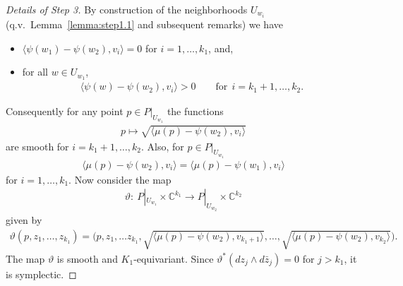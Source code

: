 \documentclass[10pt,a4paper]{amsart}
\numberwithin{equation}{section}
\begin{document}
\begin{proof}[Details of Step 3]
By construction of the neighborhoods $U_{w_i}$ (q.v.\
Lemma~\ref{lemma:step1.1} and subsequent remarks) we have
\begin{itemize}\itemsep=0pt
\item $\langle\psi(w_1)-\psi(w_2), v_i\rangle =0$ for $i=1,\ldots, k_1$, and,
\item for all $w\in U_{w_1}$,
\begin{gather*}
\langle \psi(w) - \psi(w_2), v_i\rangle>0 \qquad \textrm{for} \ \ i=k_1+1,\ldots, k_2.
\end{gather*}
\end{itemize}
Consequently  for any point $p\in P|_{U_{w_1}}$ the functions
\begin{gather*}
p\mapsto \sqrt{\langle \mu(p) - \psi(w_2),v_i \rangle}
\end{gather*}
are smooth for $i=k_1+1,\ldots, k_2$.  Also, for  $p\in P|_{U_{w_1}}$
\begin{gather*}
\langle \mu(p) - \psi(w_2),v_i \rangle = \langle \mu(p) - \psi(w_1),v_i \rangle
\end{gather*}
for $i=1,\ldots, k_1$.  Now consider the map
\begin{gather*}
\vartheta\colon \ P|_{U_{w_1}}\times {\mathbb C}^{k_1} \to P|_{U_{w_2}} \times {\mathbb C}^{k_2}
\end{gather*}
given by
\begin{gather*}
\vartheta(p,z_1,\ldots, z_{k_1}) = \Big(p,z_1,\ldots z_{k_1},
\sqrt{\langle   \mu(p) - \psi(w_2),v_{k_1+1} \rangle},\ldots ,
\sqrt{\langle \mu(p) -  \psi(w_2),v_{k_2} \rangle}\Big).
\end{gather*}
The map $\vartheta $ is smooth and $K_1$-equivariant.  Since
$\vartheta^*(dz_j\wedge d\bar{z}_j) = 0$ for $j>k_1$, it is symplectic.


\end{proof}
\end{document}
